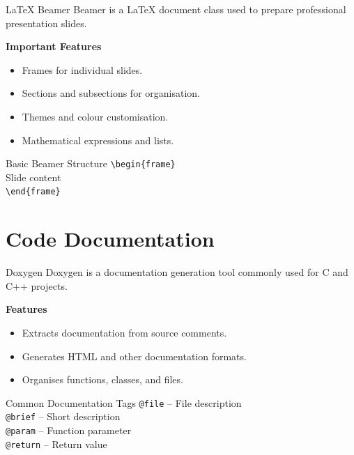 \documentclass[aspectratio=169,11pt]{beamer}
\begin{document}
\begin{frame}{LaTeX Beamer}
    Beamer is a LaTeX document class used to prepare
    professional presentation slides.

    \textbf{Important Features}
    \begin{itemize}
        \item Frames for individual slides.
        \item Sections and subsections for organisation.
        \item Themes and colour customisation.
        \item Mathematical expressions and lists.
    \end{itemize}

    \begin{block}{Basic Beamer Structure}
        \texttt{\textbackslash begin\{frame\}}\\
        Slide content\\
        \texttt{\textbackslash end\{frame\}}
    \end{block}
\end{frame}

\section{Code Documentation}

\begin{frame}{Doxygen}
    Doxygen is a documentation generation tool
    commonly used for C and C++ projects.

    \textbf{Features}
    \begin{itemize}
        \item Extracts documentation from source comments.
        \item Generates HTML and other documentation formats.
        \item Organises functions, classes, and files.
    \end{itemize}

    \begin{block}{Common Documentation Tags}
        \texttt{@file} -- File description\\
        \texttt{@brief} -- Short description\\
        \texttt{@param} -- Function parameter\\
        \texttt{@return} -- Return value
    \end{block}
\end{frame}
\end{document}
